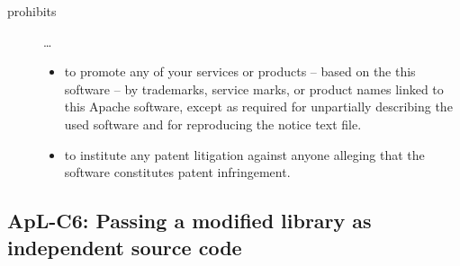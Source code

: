 \begin{description}
\begin{itemize}
\end{itemize}

\item[prohibits] \ldots
\begin{itemize}
  \item to promote any of your services or products – based on the this software
  – by trademarks, service marks, or product names linked to this Apache
  software, except as required for unpartially describing the used software and
  for reproducing the notice text file.
  \item to institute any patent litigation against anyone alleging that the
  software constitutes patent infringement.
\end{itemize}

\end{description}

\subsection{ApL-C6: Passing a modified library as independent source code}
\label{OSUC-08S-Apache20}

